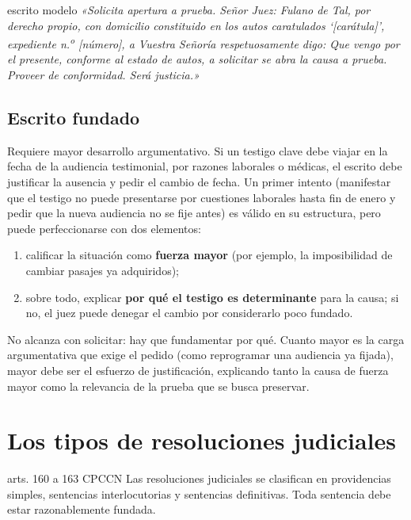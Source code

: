 \documentclass[12pt,oneside]{book}
\begin{document}
\begin{ejemplo}{escrito modelo}
\textit{«Solicita apertura a prueba. Señor Juez: Fulano de Tal, por derecho propio, con domicilio constituido en los autos caratulados `[carátula]', expediente n.\textsuperscript{o} [número], a Vuestra Señoría respetuosamente digo: Que vengo por el presente, conforme al estado de autos, a solicitar se abra la causa a prueba. Proveer de conformidad. Será justicia.»}
\end{ejemplo}

\subsection{Escrito fundado}

Requiere mayor desarrollo argumentativo. Si un testigo clave debe viajar en la fecha de la audiencia testimonial, por razones laborales o médicas, el escrito debe justificar la ausencia y pedir el cambio de fecha. Un primer intento (manifestar que el testigo no puede presentarse por cuestiones laborales hasta fin de enero y pedir que la nueva audiencia no se fije antes) es válido en su estructura, pero puede perfeccionarse con dos elementos:

\begin{enumerate}
\item calificar la situación como \textbf{fuerza mayor} (por ejemplo, la imposibilidad de cambiar pasajes ya adquiridos);
\item sobre todo, explicar \textbf{por qué el testigo es determinante} para la causa; si no, el juez puede denegar el cambio por considerarlo poco fundado.
\end{enumerate}

\begin{importante}
No alcanza con solicitar: hay que fundamentar por qué. Cuanto mayor es la carga argumentativa que exige el pedido (como reprogramar una audiencia ya fijada), mayor debe ser el esfuerzo de justificación, explicando tanto la causa de fuerza mayor como la relevancia de la prueba que se busca preservar.
\end{importante}

\section{Los tipos de resoluciones judiciales}

\begin{regla}{arts. 160 a 163 CPCCN}
Las resoluciones judiciales se clasifican en providencias simples, sentencias interlocutorias y sentencias definitivas. Toda sentencia debe estar razonablemente fundada.
\end{regla}
\end{document}
